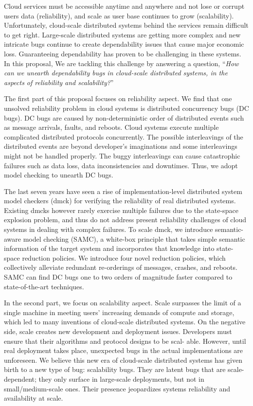 Cloud services must be accessible anytime and anywhere and not lose or corrupt
users data (reliability), and scale as user base continues to grow
(scalability). Unfortunately, cloud-scale distributed systems behind the
services remain difficult to get right. Large-scale distributed systems are
getting more complex and new intricate bugs continue to create dependability
issues that cause major economic loss. Guaranteeing dependability has proven to
be challenging in these systems. In this proposal, We are tackling this
challenge by answering a question, ``{\em How can we unearth dependability bugs
in cloud-scale distributed systems, in the aspects of reliability and
scalability?}''

The first part of this proposal focuses on reliability aspect. We find that one
unsolved reliability problem in cloud systems is distributed concurrency bugs
(DC bugs). DC bugs are caused by non-deterministic order of distributed events
such as message arrivals, faults, and reboots. Cloud systems execute multiple
complicated distributed protocols concurrently. The possible interleavings of
the distributed events are beyond developer's imaginations and some
interleavings might not be handled properly. The buggy interleavings can cause
catastrophic failures such as data loss, data inconsistencies and downtimes.
Thus, we adopt model checking to unearth DC bugs.

The last seven years have seen a rise of implementation-level distributed system
model checkers (dmck) for verifying the reliability of real distributed systems.
Existing dmcks however rarely exercise multiple failures due to the state-space
explosion problem, and thus do not address present reliability challenges of
cloud systems in dealing with complex failures. To scale dmck, we introduce
semantic-aware model checking (SAMC), a white-box principle that takes simple
semantic information of the target system and incorporates that knowledge into
state-space reduction policies. We introduce four novel reduction policies,
which collectively alleviate redundant re-orderings of messages, crashes, and
reboots. SAMC can find DC bugs one to two orders of magnitude faster compared to
state-of-the-art techniques. 

In the second part, we focus on scalability aspect. Scale surpasses the limit of
a single machine in meeting users' increasing demands of compute and storage,
which led to many inventions of cloud-scale distributed systems.  On the
negative side, scale creates new development and deployment issues.  Developers
must ensure that their algorithms and protocol designs to be scal- able.
However, until real deployment takes place, unexpected bugs in the actual
implementations are unforeseen. We believe this new era of cloud-scale
distributed systems has given birth to a new type of bug: scalability bugs.
They are latent bugs that are scale-dependent; they only surface in large-scale
deployments, but not in small/medium-scale ones. Their presence jeopardizes
systems reliability and availability at scale.

